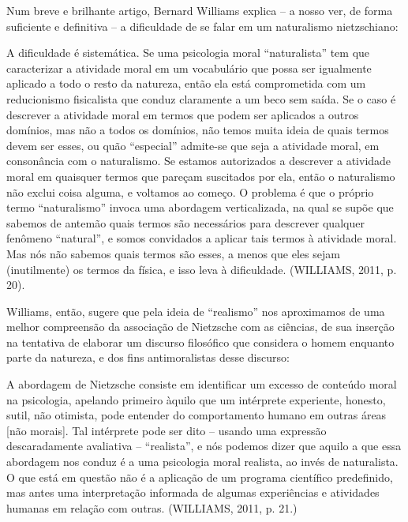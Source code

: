 \documentclass[
	12pt,				%
	openright,			%
	oneside,			%
	a4paper,			%
	english,			%
	french,				%
	spanish,			%
	brazil				%
	]{abntex2}
\begin{document}
	Num breve e brilhante artigo, Bernard Williams explica – a nosso ver, de forma suficiente e definitiva – a dificuldade de se falar em um naturalismo nietzschiano: 
	
\begin{citacao}
A dificuldade é sistemática. Se uma psicologia moral “naturalista” tem que caracterizar a atividade moral em um vocabulário que possa ser igualmente aplicado a todo o resto da natureza, então ela está comprometida com um reducionismo fisicalista que conduz claramente a um beco sem saída. Se o caso é descrever a atividade moral em termos que podem ser aplicados a outros domínios, mas não a todos os domínios, não temos muita ideia de quais termos devem ser esses, ou quão “especial” admite-se que seja a atividade moral, em consonância com o naturalismo. Se estamos autorizados a descrever a atividade moral em quaisquer termos que pareçam suscitados por ela, então o naturalismo não exclui coisa alguma, e voltamos ao começo. O problema é que o próprio termo “naturalismo” invoca uma abordagem verticalizada, na qual se supõe que sabemos de antemão quais termos são necessários para descrever qualquer fenômeno “natural”, e somos convidados a aplicar tais termos à atividade moral. Mas nós não sabemos quais termos são esses, a menos que eles sejam (inutilmente) os termos da física, e isso leva à dificuldade. (WILLIAMS, 2011, p. 20).
\end{citacao}

	Williams, então, sugere que pela ideia de “realismo” nos aproximamos de uma melhor compreensão da associação de Nietzsche com as ciências, de sua inserção na tentativa de elaborar um discurso filosófico que considera o homem enquanto parte da natureza, e dos fins antimoralistas desse discurso:

\begin{citacao}
A abordagem de Nietzsche consiste em identificar um excesso de conteúdo moral na psicologia, apelando primeiro àquilo que um intérprete experiente, honesto, sutil, não otimista, pode entender do comportamento humano em outras áreas [não morais]. Tal intérprete pode ser dito – usando uma expressão descaradamente avaliativa – “realista”, e nós podemos dizer que aquilo a que essa abordagem nos conduz é a uma psicologia moral realista, ao invés de naturalista. O que está em questão não é a aplicação de um programa científico predefinido, mas antes uma interpretação informada de algumas experiências e atividades humanas em relação com outras. (WILLIAMS, 2011, p. 21.)
\end{citacao}
\end{document}
